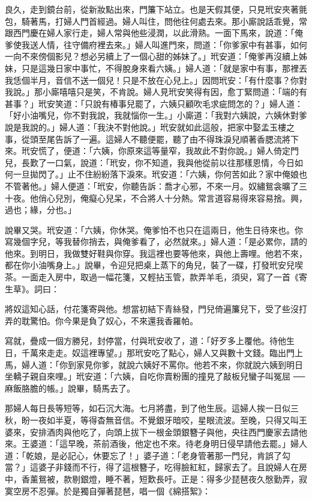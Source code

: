 \begin{showcontents}{}
良久，走到鏡台前，從新妝點出來，門簾下站立。也是天假其便，只見玳安夾著氈包，騎著馬，打婦人門首經過。婦人叫住，問他往何處去來。那小廝說話乖覺，常跟西門慶在婦人家行走，婦人常與他些浸潤，以此滑熟。一面下馬來，說道：「俺爹使我送人情，往守備府裡去來。」婦人叫進門來，問道：「你爹家中有甚事，如何一向不來傍個影兒？想必另續上了一個心甜的姊妹了。」玳安道：「俺爹再沒續上姊妹，只是這幾日家中事忙，不得脫身來看六姨。」婦人道：「就是家中有事，那裡丟我恁個半月，音信不送一個兒！只是不放在心兒上。」因問玳安：「有什麼事？你對我說。」那小廝嘻嘻只是笑，不肯說。婦人見玳安笑得有因，愈丁緊問道：「端的有甚事？」玳安笑道：「只說有椿事兒罷了，六姨只顧吹毛求疵問怎的？」婦人道：「好小油嘴兒，你不對我說，我就惱你一生。」小廝道：「我對六姨說，六姨休對爹說是我說的。」婦人道：「我決不對他說。」玳安就如此這般，把家中娶孟玉樓之事，從頭至尾告訴了一遍。這婦人不聽便罷，聽了由不得珠淚兒順著香腮流將下來。玳安慌了，便道：「六姨，你原來這等量窄，我故此不對你說。」婦人倚定門兒，長歎了一口氣，說道：「玳安，你不知道，我與他從前以往那樣恩情，今日如何一旦拋閃了。」止不住紛紛落下淚來。玳安道：「六姨，你何苦如此？家中俺娘也不管著他。」婦人便道：「玳安，你聽告訴：喬才心邪，不來一月。奴繡鴛衾曠了三十夜。他俏心兒別，俺癡心兒呆，不合將人十分熱。常言道容易得來容易捨。興，過也；緣，分也。」

說畢又哭。玳安道：「六姨，你休哭。俺爹怕不也只在這兩日，他生日待來也。你寫幾個字兒，等我替你捎去，與俺爹看了，必然就來。」婦人道：「是必累你，請的他來。到明日，我做雙好鞋與你穿。我這裡也要等他來，與他上壽哩。他若不來，都在你小油嘴身上。」說畢，令迎兒把桌上蒸下的角兒，裝了一碟，打發玳安兒喫茶。一面走入房中，取過一幅花箋，又輕拈玉管，款弄羊毛，須臾，寫了一首《寄生草》。詞曰：

將奴這知心話，付花箋寄與他。想當初結下青絲發，門兒倚遍簾兒下，受了些沒打弄的耽驚怕。你今果是負了奴心，不來還我香羅帕。

寫就，疊成一個方勝兒，封停當，付與玳安收了，道：「好歹多上覆他。待他生日，千萬來走走。奴這裡專望。」那玳安吃了點心，婦人又與數十文錢。臨出門上馬，婦人道：「你到家見你爹，就說六姨好不罵你。他若不來，你就說六姨到明日坐轎子親自來哩。」玳安道：「六姨，自吃你賣粉團的撞見了敲板兒蠻子叫冤屈 ──麻飯胳膽的帳。」說畢，騎馬去了。

那婦人每日長等短等，如石沉大海。七月將盡，到了他生辰。這婦人挨一日似三秋，盼一夜如半夏，等得杳無音信。不覺銀牙暗咬，星眼流波。至晚，只得又叫王婆來，安排酒肉與他吃了，向頭上拔下一根金頭銀簪子與他，央往西門慶家去請他來。王婆道：「這早晚，茶前酒後，他定也不來。待老身明日侵早請他去罷。」婦人道：「乾娘，是必記心，休要忘了！」婆子道：「老身管著那一門兒，肯誤了勾當？」這婆子非錢而不行，得了這根簪子，吃得臉紅紅，歸家去了。且說婦人在房中，香薰鴛被，款剔銀燈，睡不著，短歎長吁。正是：得多少琵琶夜久慇勤弄，寂寞空房不忍彈。於是獨自彈著琵琶，唱一個《綿搭絮》：


\end{showcontents}
